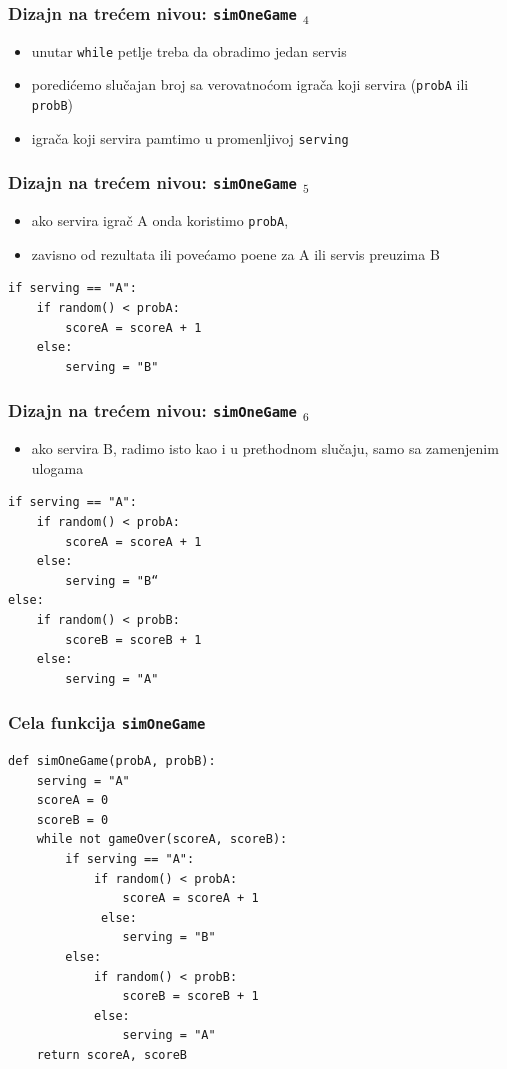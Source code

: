 \documentclass[utf8,compress]{beamer}
\begin{document}
\begin{frame}[fragile]
  \frametitle{Dizajn na trećem nivou: \texttt{simOneGame} $_4$}
\begin{itemize}
  \item unutar \texttt{while} petlje treba da obradimo jedan servis
  \item poredićemo slučajan broj sa verovatnoćom igrača koji servira (\texttt{probA} ili \texttt{probB})
  \item igrača koji servira pamtimo u promenljivoj \texttt{serving}
\end{itemize}
\end{frame}

\begin{frame}[fragile]
  \frametitle{Dizajn na trećem nivou: \texttt{simOneGame} $_5$}
\begin{itemize}
  \item ako servira igrač A onda koristimo \texttt{probA}, 
  \item zavisno od rezultata ili povećamo poene za A ili servis preuzima B
\end{itemize}
\begin{verbatim}
if serving == "A":
    if random() < probA:
        scoreA = scoreA + 1
    else:
        serving = "B"
\end{verbatim}
\end{frame}

\begin{frame}[fragile]
  \frametitle{Dizajn na trećem nivou: \texttt{simOneGame} $_6$}
\begin{itemize}
  \item ako servira B, radimo isto kao i u prethodnom slučaju, samo sa zamenjenim ulogama
\end{itemize}
\begin{verbatim}
if serving == "A":
    if random() < probA:
        scoreA = scoreA + 1
    else:
        serving = "B“
else:
    if random() < probB:
        scoreB = scoreB + 1
    else:
        serving = "A"
\end{verbatim}
\end{frame}

\begin{frame}[fragile,shrink=5]
  \frametitle{Cela funkcija \texttt{simOneGame}}
\begin{verbatim}
def simOneGame(probA, probB):
    serving = "A"
    scoreA = 0
    scoreB = 0
    while not gameOver(scoreA, scoreB):
        if serving == "A":
            if random() < probA:
                scoreA = scoreA + 1
             else:
                serving = "B"
        else:
            if random() < probB:
                scoreB = scoreB + 1
            else:
                serving = "A"
    return scoreA, scoreB
\end{verbatim}
\end{frame}
\end{document}
